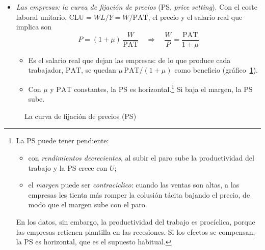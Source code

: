 \documentclass[11pt]{article}
\begin{document}
\begin{itemize}
\item \emph{Las empresas: la curva de fijación de precios} (PS, \emph{price setting}). Con el coste laboral unitario, $\mathrm{CLU}=WL/Y=W/\mathrm{PAT}$, el precio y el salario real que implica son
  \begin{equation}
  P=(1+\mu)\,\frac{W}{\mathrm{PAT}}\quad\Longrightarrow\quad\frac{W}{P}=\frac{\mathrm{PAT}}{1+\mu} \label{eq:ps}
  \end{equation}
  \begin{itemize}
  \item Es el salario real que dejan las empresas: de lo que produce cada trabajador, $\mathrm{PAT}$, se quedan $\mu\,\mathrm{PAT}/(1+\mu)$ como beneficio (gráfico~\ref{fig:ps-curva}).
  \item Con $\mu$ y $\mathrm{PAT}$ constantes, la PS es horizontal.\footnote{La PS puede tener pendiente:
\begin{itemize}
\item con \emph{rendimientos decrecientes}, al subir el paro sube la productividad del trabajo y la PS crece con $U$;
\item el \emph{margen} puede ser \emph{contracíclico}: cuando las ventas son altas, a las empresas les tienta más romper la colusión tácita bajando el precio, de modo que el margen sube con el paro\nocite{RotembergWoodford1991Markups}.
\end{itemize}
En los datos, sin embargo, la productividad del trabajo es procíclica, porque las empresas retienen plantilla en las recesiones. Si los efectos se compensan, la PS es horizontal, que es el supuesto habitual.} Si baja el margen, la PS sube.
  \end{itemize}
\end{itemize}

\begin{figure}[H]
\centering
\caption{La curva de fijación de precios (PS)}\label{fig:ps-curva}
\end{figure}
\end{document}
